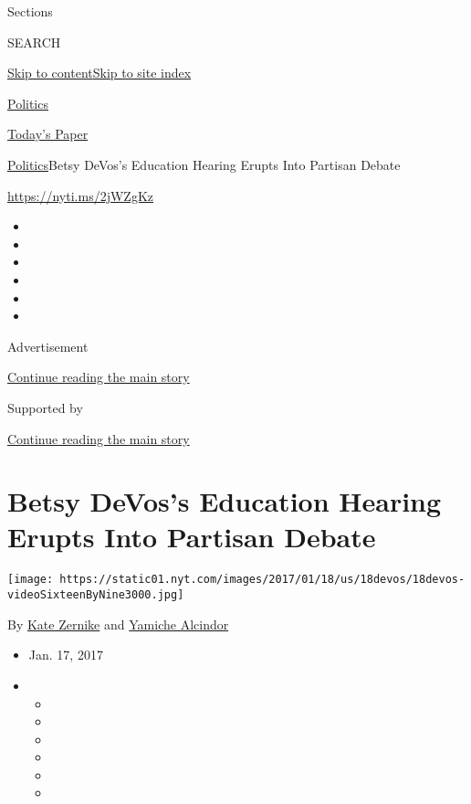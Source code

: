Sections

SEARCH

\protect\hyperlink{site-content}{Skip to
content}\protect\hyperlink{site-index}{Skip to site index}

\href{https://www.nytimes.com/section/politics}{Politics}

\href{https://myaccount.nytimes.com/auth/login?response_type=cookie\&client_id=vi}{}

\href{https://www.nytimes.com/section/todayspaper}{Today's Paper}

\href{/section/politics}{Politics}\textbar{}Betsy DeVos's Education
Hearing Erupts Into Partisan Debate

\url{https://nyti.ms/2jWZgKz}

\begin{itemize}
\item
\item
\item
\item
\item
\item
\end{itemize}

Advertisement

\protect\hyperlink{after-top}{Continue reading the main story}

Supported by

\protect\hyperlink{after-sponsor}{Continue reading the main story}

\hypertarget{betsy-devoss-education-hearing-erupts-into-partisan-debate}{%
\section{Betsy DeVos's Education Hearing Erupts Into Partisan
Debate}\label{betsy-devoss-education-hearing-erupts-into-partisan-debate}}

\texttt{[image: https://static01.nyt.com/images/2017/01/18/us/18devos/18devos-videoSixteenByNine3000.jpg]}

By \href{http://www.nytimes.com/by/kate-zernike}{Kate Zernike} and
\href{http://www.nytimes.com/by/yamiche-alcindor}{Yamiche Alcindor}

\begin{itemize}
\item
  Jan. 17, 2017
\item
  \begin{itemize}
  \item
  \item
  \item
  \item
  \item
  \item
  \end{itemize}
\end{itemize}

